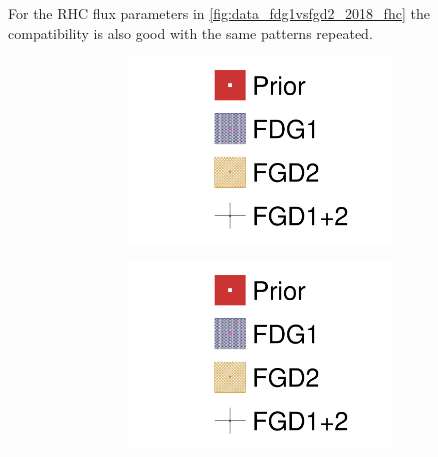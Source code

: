 For the RHC flux parameters in \autoref{fig:data_fdg1vsfgd2_2018_fhc} the compatibility is also good with the same patterns repeated.
\begin{figure}[h]
	\centering
	\begin{subfigure}[t]{\textwidth}
		\begin{subfigure}[t]{0.24\textwidth}
			\includegraphics[width=\textwidth,page=6, trim={0mm 0mm 0mm 9mm}, clip]{figures/mach3/2018/data/2018a_FixedCov_RedCov_Mpi_FGD1Only_Data_merge_2018a_FixedCov_RedCov_Mpi_FGD2Only_Data_merge_2018a_FixedCov_RedCov_Mpi_Data_merge}
		\end{subfigure}
		\begin{subfigure}[t]{0.24\textwidth}
			\includegraphics[width=\textwidth,page=7, trim={0mm 0mm 0mm 9mm}, clip]{figures/mach3/2018/data/2018a_FixedCov_RedCov_Mpi_FGD1Only_Data_merge_2018a_FixedCov_RedCov_Mpi_FGD2Only_Data_merge_2018a_FixedCov_RedCov_Mpi_Data_merge}

\end{subfigure}
\end{subfigure}
\end{figure}
